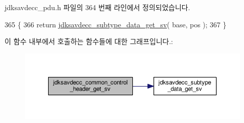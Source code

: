 jdksavdecc\+\_\+pdu.\+h 파일의 364 번째 라인에서 정의되었습니다.


\begin{DoxyCode}
365 \{
366     \textcolor{keywordflow}{return} \hyperlink{group__jdksavdecc__subtype__data_gaf9cb8fd6301567848c0ab126ab7f562e}{jdksavdecc\_subtype\_data\_get\_sv}( base, pos );
367 \}
\end{DoxyCode}


이 함수 내부에서 호출하는 함수들에 대한 그래프입니다.\+:
\nopagebreak
\begin{figure}[H]
\begin{center}
\leavevmode
\includegraphics[width=350pt]{group__jdksavdecc__avtp__common__control__header_ga00819aee969a77e05716ede751b99201_cgraph}
\end{center}
\end{figure}




